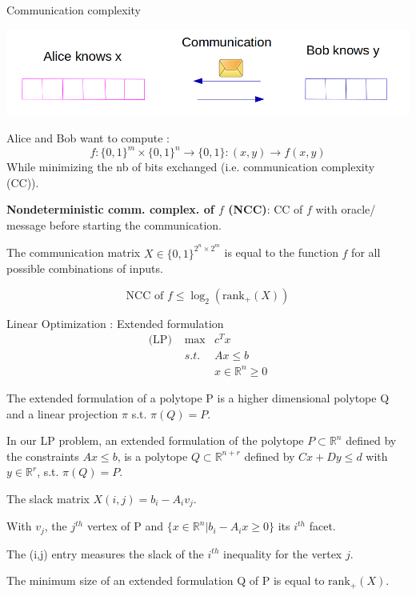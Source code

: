 \begin{frame}{Communication complexity}
\begin{center}
\includegraphics[scale=0.2]{Section4/communication.png}
\end{center}
\small
Alice and Bob want to compute :
\[f:\{0,1\}^m \times \{0,1\}^n \rightarrow \{0,1\} : (x,y) \rightarrow f(x,y)
\]
While minimizing the nb of bits exchanged (i.e. communication complexity (CC)).


\textbf{Nondeterministic comm. complex. of $f$ (NCC)}: CC of $f$ with oracle/ message before starting the communication.


The communication matrix $X \in \{0,1\}^{2^n\times 2^m}$ is equal to the function $f$ for all possible combinations of inputs.

\begin{thm}[Yannakis]
\[\text{NCC of } f \leq \log_2(\text{rank}_+(X))
\]
\end{thm}
\end{frame}

\begin{frame}{Linear Optimization : Extended formulation}
\begin{align*}
\text{(LP) } & \max & c^T x\\
 &s.t. & Ax\leq b\\
 & & x \in \mathbb{R}^n \geq 0
\end{align*}
\begin{defn}
The extended formulation of a polytope P is a higher dimensional polytope Q and a linear projection $\pi$ s.t. $\pi(Q) = P$.
\end{defn}
In our LP problem, an extended formulation of the polytope $P \subset \mathbb{R}^n$ defined by the constraints $Ax\leq b$, is a polytope $Q\subset \mathbb{R}^{n+r}$ defined by $Cx+Dy \leq d$ with $y\in \mathbb{R}^r$, s.t. $\pi(Q) = P$.

\end{frame}

\begin{frame}
The slack matrix $X(i,j) = b_i-A_iv_j$.

With $v_j$, the $j^{th}$ vertex of P and $\{x\in \mathbb{R}^n | b_i-A_ix\geq 0\}$ its $i^{th}$ facet.

The (i,j) entry measures the slack of the $i^{th}$ inequality for the vertex $j$. 
\begin{thm}[Yannakis]
The minimum size of an extended formulation Q of P is equal to $\text{rank}_+(X)$.
\end{thm}
\end{frame}